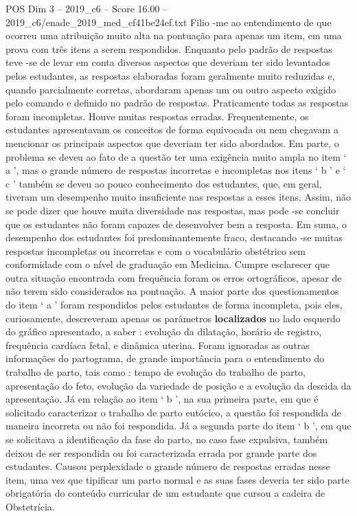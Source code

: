 \begin{textsample}{POS Dim 3 – 2019\_c6 – Score 16.00 – 2019\_c6/enade\_2019\_med\_cf41be24ef.txt}
Filio -me ao entendimento de que ocorreu uma atribuição muito alta na pontuação para apenas um item, em uma prova com três itens a serem respondidos.
Enquanto pelo padrão de respostas teve -se de levar em conta diversos aspectos que deveriam ter sido levantados pelos estudantes, as respostas elaboradas foram geralmente muito reduzidas e, quando parcialmente corretas, abordaram apenas um ou outro aspecto exigido pelo comando e definido no padrão de respostas.
Praticamente todas as respostas foram incompletas.
Houve muitas respostas erradas.
Frequentemente, os estudantes apresentavam os conceitos de forma equivocada ou nem chegavam a mencionar os principais aspectos que deveriam ter sido abordados.
Em parte, o problema se deveu ao fato de a questão ter uma exigência muito ampla no item ‘ a ’, mas o grande número de respostas incorretas e incompletas nos itens ‘ b ’ e ‘ c ’ também se deveu ao pouco conhecimento dos estudantes, que, em geral, tiveram um desempenho muito insuficiente nas respostas a esses itens.
Assim, não se pode dizer que houve muita diversidade nas respostas, mas pode -se concluir que os estudantes não foram capazes de desenvolver bem a resposta.
Em suma, o desempenho dos estudantes foi predominantemente fraco, destacando -se muitas respostas incompletas ou incorretas e com o vocabulário obstétrico sem conformidade com o nível de graduação em Medicina.
Cumpre esclarecer que outra situação encontrada com frequência foram os erros ortográficos, apesar de não terem sido considerados na pontuação.
A maior parte dos questionamentos do item ‘ a ’ foram respondidos pelos estudantes de forma incompleta, pois eles, curiosamente, descreveram apenas os parâmetros \textbf{localizados} no lado esquerdo do gráfico apresentado, a saber : evolução da dilatação, horário de registro, frequência cardíaca fetal, e dinâmica uterina.
Foram ignoradas as outras informações do partograma, de grande importância para o entendimento do trabalho de parto, tais como : tempo de evolução do trabalho de parto, apresentação do feto, evolução da variedade de posição e a evolução da descida da apresentação.
Já em relação ao item ‘ b ’, na sua primeira parte, em que é solicitado caracterizar o trabalho de parto eutócico, a questão foi respondida de maneira incorreta ou não foi respondida.
Já a segunda parte do item ‘ b ’, em que se solicitava a identificação da fase do parto, no caso fase expulsiva, também deixou de ser respondida ou foi caracterizada errada por grande parte dos estudantes.
Causou perplexidade o grande número de respostas erradas nesse item, uma vez que tipificar um parto normal e as suas fases deveria ter sido parte obrigatória do conteúdo curricular de um estudante que cursou a cadeira de Obstetrícia.

\end{textsample}
